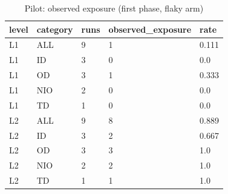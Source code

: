\begin{table}[t]
\centering\small
\caption{Pilot: observed exposure (first phase, flaky arm)}
\label{tab:pilot_exposure}
\begin{tabular}{lllll}
\toprule
\textbf{level} & \textbf{category} & \textbf{runs} & \textbf{observed\_exposure} & \textbf{rate} \\
\midrule
L1 & ALL & 9 & 1 & 0.111 \\
L1 & ID & 3 & 0 & 0.0 \\
L1 & OD & 3 & 1 & 0.333 \\
L1 & NIO & 2 & 0 & 0.0 \\
L1 & TD & 1 & 0 & 0.0 \\
L2 & ALL & 9 & 8 & 0.889 \\
L2 & ID & 3 & 2 & 0.667 \\
L2 & OD & 3 & 3 & 1.0 \\
L2 & NIO & 2 & 2 & 1.0 \\
L2 & TD & 1 & 1 & 1.0 \\
\bottomrule
\end{tabular}
\end{table}
